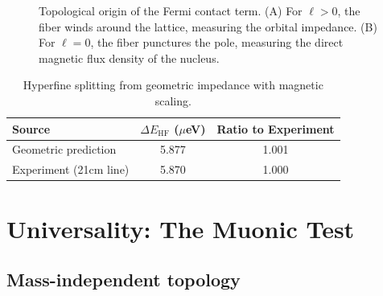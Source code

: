 \documentclass[aps,prl,twocolumn,showpacs,superscriptaddress,groupedaddress]{revtex4-2}
\begin{document}
\begin{figure}[t]
\centering
\begin{minipage}{0.48\columnwidth}
\centering
{}
\end{minipage}
\begin{minipage}{0.48\columnwidth}
\centering
{}
\end{minipage}
\caption{Topological origin of the Fermi contact term. (A) For $\ell>0$, the fiber winds
around the lattice, measuring the orbital impedance. (B) For $\ell=0$, the fiber punctures
the pole, measuring the direct magnetic flux density of the nucleus.}
\label{fig:puncture}
\end{figure}

\begin{table}[t]
\centering
\begin{tabular}{l S[table-format=1.3] S[table-format=1.3]}
\toprule
Source & {$\Delta E_{\mathrm{HF}}$ ($\mu$eV)} & {Ratio to Experiment} \\
\midrule
Geometric prediction & 5.877 & 1.001 \\
Experiment (21cm line) & 5.870 & 1.000 \\
\bottomrule
\end{tabular}
\caption{Hyperfine splitting from geometric impedance with magnetic scaling.}
\label{tab:hyperfine}
\end{table}

\section{Universality: The Muonic Test}

\subsection{Mass-independent topology}
\end{document}
